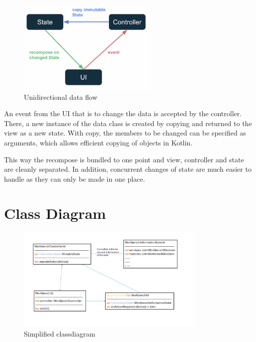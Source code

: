 \begin{center}
    \begin{figure}[H]
            \includegraphics[width=0.6\textwidth]{images/unidirectional data flow.png}
            \centering
            \caption{Unidirectional data flow}
   \end{figure}
\end{center} 

An event from the UI that is to change the data is accepted by the controller. There, a new instance of the data class is created by copying and returned to the view as a new state.
With copy, the members to be changed can be specified as arguments, which allows efficient copying of objects in Kotlin.

This way the recompose is bundled to one point and view, controller and state are cleanly separated. In addition, concurrent changes of state are much easier to handle as they can only be made in one place.


\section{Class Diagram}
\begin{center}
    \begin{figure}[H]
            \includegraphics[width=0.8\textwidth]{images/classDiagram.png}
            \centering
            \caption{Simplified classdiagram}
   \end{figure}
\end{center} 

